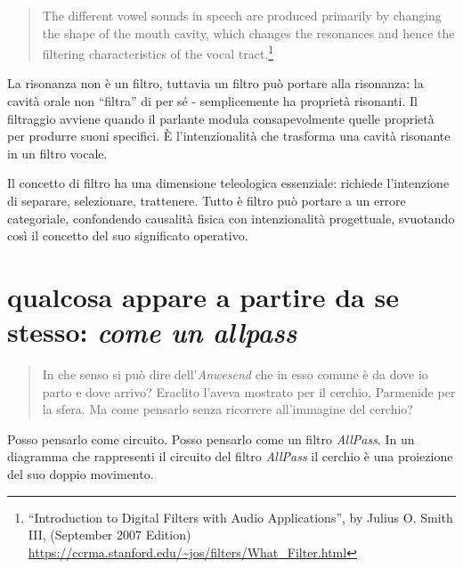\begin{quote}
  \begin{sf}
    \small
    The different vowel sounds in speech are produced primarily by changing the
    shape of the mouth cavity, which changes the resonances and hence the
    filtering characteristics of the vocal tract.\footnote{
    “Introduction to Digital Filters with Audio Applications”, by Julius O.
    Smith III, (September 2007 Edition)
    \url{https://ccrma.stanford.edu/~jos/filters/What_Filter.html}
    }
  \end{sf}
\end{quote}

La risonanza non è un filtro, tuttavia un filtro può portare alla risonanza: la
cavità orale non “filtra” di per sé - semplicemente ha proprietà risonanti. Il
filtraggio avviene quando il parlante modula consapevolmente quelle proprietà
per produrre suoni specifici. È l'intenzionalità che trasforma una cavità
risonante in un filtro vocale.

Il concetto di filtro ha una dimensione teleologica essenziale: richiede
l'intenzione di separare, selezionare, trattenere. Tutto è filtro può portare a
un errore categoriale, confondendo causalità fisica con intenzionalità
progettuale, svuotando così il concetto del suo significato operativo.

\section{qualcosa appare a partire da se stesso: \emph{come un allpass}}

\begin{quote}
  \begin{sf}
    \small
    In che senso si può dire dell'\emph{Anwesend} che in esso comune è da dove
    io parto e dove arrivo? Eraclito l'aveva mostrato per il cerchio, Parmenide
    per la sfera. Ma come pensarlo senza ricorrere all'immagine del cerchio?
  \end{sf}
\end{quote}

Posso pensarlo come circuito. Posso pensarlo come un filtro \emph{AllPass}. In
un diagramma che rappresenti il circuito del filtro \emph{AllPass} il cerchio è
una proiezione del suo doppio movimento.

\begin{figure}[ht]
  \centering
  \label{tikz:ciclobase}
\end{figure}



